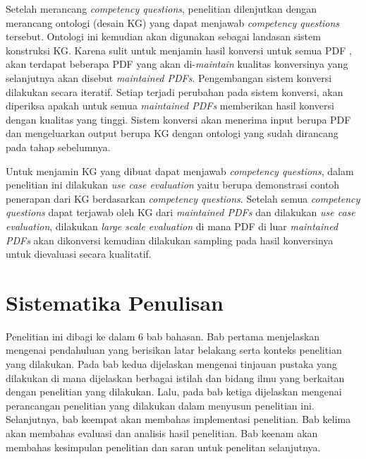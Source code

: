 Setelah merancang \textit{competency questions}, penelitian dilenjutkan dengan merancang ontologi
(desain KG) yang dapat menjawab \textit{competency questions} tersebut. Ontologi ini kemudian akan
digunakan sebagai landasan sistem konstruksi KG. Karena sulit untuk menjamin hasil konversi untuk
semua PDF \legal, akan terdapat beberapa PDF yang akan di-\textit{maintain} kualitas konversinya
yang selanjutnya akan disebut \textit{maintained PDFs}. Pengembangan sistem konversi dilakukan
secara iteratif. Setiap terjadi perubahan pada sistem konversi, akan diperiksa apakah untuk semua
\textit{maintained PDFs} memberikan hasil konversi dengan kualitas yang tinggi. Sistem konversi akan
menerima input berupa PDF dan mengeluarkan output berupa KG dengan ontologi yang sudah dirancang
pada tahap sebelumnya.

Untuk menjamin KG yang dibuat dapat menjawab \textit{competency questions}, dalam penelitian ini
dilakukan \textit{use case evaluation} yaitu berupa demonstrasi contoh penerapan dari KG berdasarkan
\textit{competency questions}. Setelah semua \textit{competency questions} dapat terjawab oleh KG
dari \textit{maintained PDFs} dan dilakukan \textit{use case evaluation}, dilakukan \textit{large
scale evaluation} di mana PDF di luar \textit{maintained PDFs} akan dikonversi kemudian dilakukan
sampling pada hasil konversinya untuk dievaluasi secara kualitatif.

\section{Sistematika Penulisan}
\label{sec:sistematika-penulisan}

Penelitian ini dibagi ke dalam 6 bab bahasan. Bab pertama menjelaskan mengenai pendahuluan yang
berisikan latar belakang serta konteks penelitian yang dilakukan. Pada bab kedua dijelaskan mengenai
tinjauan pustaka yang dilakukan di mana dijelaskan berbagai istilah dan bidang ilmu yang berkaitan
dengan penelitian yang dilakukan. Lalu, pada bab ketiga dijelaskan mengenai perancangan penelitian
yang dilakukan dalam menyusun penelitian ini. Selanjutnya, bab keempat akan membahas implementasi
penelitian. Bab kelima akan membahas evaluasi dan analisis hasil penelitian. Bab keenam akan
membahas kesimpulan penelitian dan saran untuk penelitan selanjutnya.